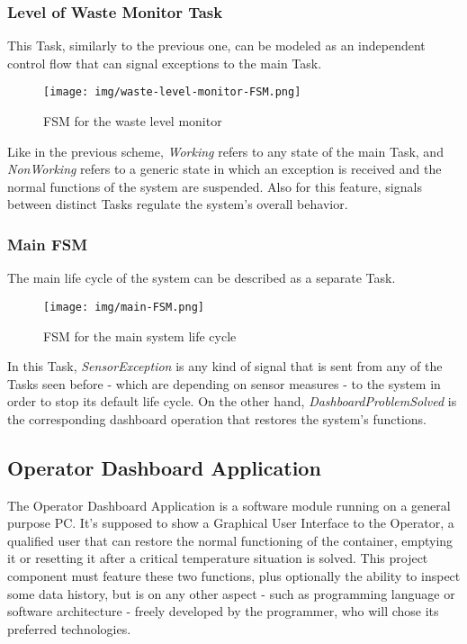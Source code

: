 \documentclass[a4paper,12pt]{report}
\begin{document}
	\subsubsection{Level of Waste Monitor Task}
	This Task, similarly to the previous one, can be modeled as an independent control flow that can signal exceptions to the main Task. 
	\begin{figure}[H]
		\centering{}
		\texttt{[image: img/waste-level-monitor-FSM.png]}
		\caption{FSM for the waste level monitor}
		\label{img:waste-level-FSM}
	\end{figure}
	Like in the previous scheme, \emph{Working} refers to any state of the main Task, and \emph{NonWorking} refers to a generic state in which an exception is received and the normal functions of the system are suspended. Also for this feature, signals between distinct Tasks regulate the system's overall behavior.
	
	\subsubsection{Main FSM}
	The main life cycle of the system can be described as a separate Task.
	\begin{figure}[H]
		\centering{}
		\texttt{[image: img/main-FSM.png]}
		\caption{FSM for the main system life cycle}
		\label{img:main-FSM}
	\end{figure}
	In this Task, \emph{SensorException} is any kind of signal that is sent from any of the Tasks seen before - which are depending on sensor measures - to the system in order to stop its default life cycle. On the other hand, \emph{DashboardProblemSolved} is the corresponding dashboard operation that restores the system's functions.
	
	\subsection{Operator Dashboard Application}
	The Operator Dashboard Application is a software module running on a general purpose PC. It's supposed to show a Graphical User Interface to the Operator, a qualified user that can restore the normal functioning of the container, emptying it or resetting it after a critical temperature situation is solved.\newline
	This project component must feature these two functions, plus optionally the ability to inspect some data history, but is on any other aspect - such as programming language or software architecture - freely developed by the programmer, who will chose its preferred technologies.
	
\end{document}
